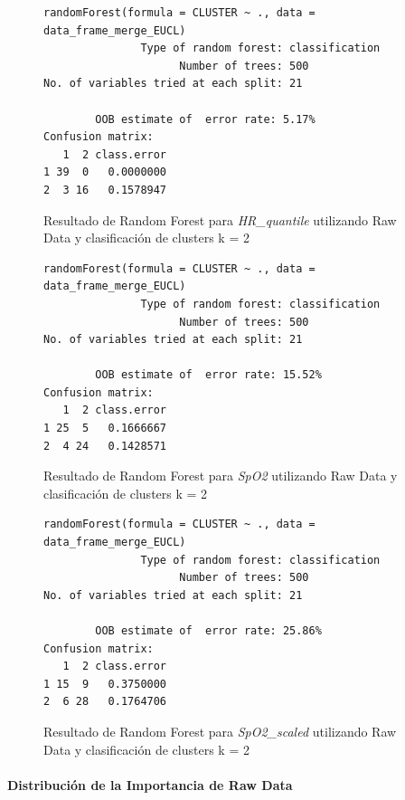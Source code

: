 \begin{figure}[H]
    \centering
    \begin{lstlisting}[frame=single, basicstyle=\small\ttfamily]
        randomForest(formula = CLUSTER ~ ., data = data_frame_merge_EUCL) 
               Type of random forest: classification
                     Number of trees: 500
No. of variables tried at each split: 21

        OOB estimate of  error rate: 5.17%
Confusion matrix:
   1  2 class.error
1 39  0   0.0000000
2  3 16   0.1578947
    \end{lstlisting}
    \caption{Resultado de Random Forest para \textit{HR\_quantile} utilizando Raw Data y clasificación de clusters k = 2}
    \label{fig:random_forest_eucl_result_RF_3}
\end{figure}

\begin{figure}[H]
    \centering
    \begin{lstlisting}[frame=single, basicstyle=\small\ttfamily]
        randomForest(formula = CLUSTER ~ ., data = data_frame_merge_EUCL) 
               Type of random forest: classification
                     Number of trees: 500
No. of variables tried at each split: 21

        OOB estimate of  error rate: 15.52%
Confusion matrix:
   1  2 class.error
1 25  5   0.1666667
2  4 24   0.1428571
    \end{lstlisting}
    \caption{Resultado de Random Forest para \textit{SpO2} utilizando Raw Data y clasificación de clusters k = 2}\label{fig:random_forest_eucl_result_RF_4}
\end{figure}
\begin{figure}[H]
    \centering
    \begin{lstlisting}[frame=single, basicstyle=\small\ttfamily]
        randomForest(formula = CLUSTER ~ ., data = data_frame_merge_EUCL) 
               Type of random forest: classification
                     Number of trees: 500
No. of variables tried at each split: 21

        OOB estimate of  error rate: 25.86%
Confusion matrix:
   1  2 class.error
1 15  9   0.3750000
2  6 28   0.1764706
    \end{lstlisting}
    \caption{Resultado de Random Forest para \textit{SpO2\_scaled} utilizando Raw Data y clasificación de clusters k = 2}
    \label{fig:random_forest_eucl_result_RF_5}
\end{figure}

\paragraph{Distribución de la Importancia de Raw Data}

